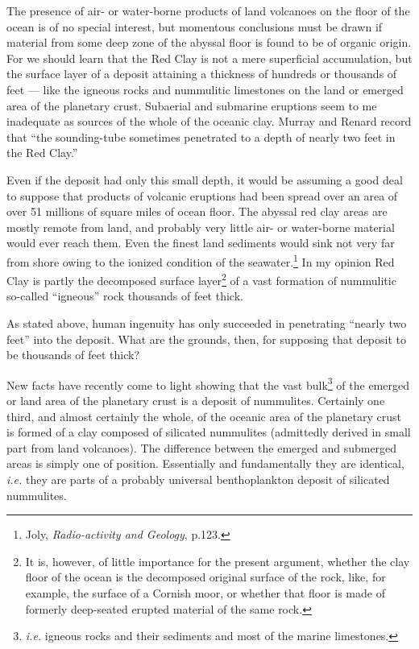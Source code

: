 \documentclass[a4paper, 12pt, oneside]{article}
\begin{document}
The presence of air- or water-borne products of land volcanoes on the floor of the ocean is of no special interest, but momentous conclusions must be drawn if material from some deep zone of the abyssal floor is found to be of organic origin. For we should learn that the Red Clay is not a mere superficial accumulation, but the surface layer of a deposit attaining a thickness of hundreds or thousands of feet --- like the igneous rocks and nummulitic limestones on the land or emerged area of the planetary crust. Subaerial and submarine eruptions seem to me inadequate as sources of the whole of the oceanic clay. Murray and Renard record that ``the sounding-tube sometimes penetrated to a depth of nearly two feet in the Red Clay.''

Even if the deposit had only this small depth, it would be assuming a good deal to suppose that products of volcanic eruptions had been spread over an area of over 51 millions of square miles of ocean floor. The abyssal red clay areas are mostly remote from land, and probably very little air- or water-borne material would ever reach them. Even the finest land sediments would sink not very far from shore owing to the ionized condition of the seawater.\footnote{Joly, \emph{Radio-activity and Geology}, p.123.} In my opinion Red Clay is partly the decomposed surface layer\footnote{It is, however, of little importance for the present argument, whether the clay floor of the ocean is the decomposed original surface of the rock, like, for example, the surface of a Cornish moor, or whether that floor is made of formerly deep-seated erupted material of the same rock.} of a vast formation of nummulitic so-called ``igneous'' rock thousands of feet thick.

As stated above, human ingenuity has only succeeded in penetrating ``nearly two feet'' into the deposit. What are the grounds, then, for supposing that deposit to be thousands of feet thick?

New facts have recently come to light showing that the vast bulk\footnote{\emph{i.e.} igneous rocks and their sediments and most of the marine limestones.} of the emerged or land area of the planetary crust is a deposit of nummulites. Certainly one third, and almost certainly the whole, of the oceanic area of the planetary crust is formed of a clay composed of silicated nummulites (admittedly derived in small part from land volcanoes). The difference between the emerged and submerged areas is simply one of position. Essentially and fundamentally they are identical, \emph{i.e.} they are parts of a probably universal benthoplankton deposit of silicated nummulites.
\end{document}
